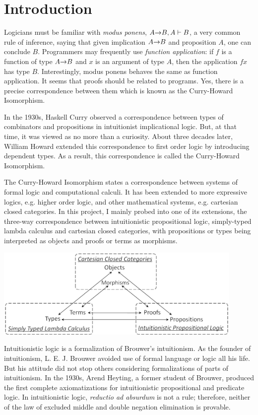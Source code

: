 \section{Introduction}
\label{sec:introduction}

Logicians must be familiar with \emph{modus ponens}, $ A \mathord{\to} B, A \vdash B $, a very common rule of inference, saying that given implication $ A \mathord{\to} B $ and proposition $ A $, one can conclude $ B $. Programmers may frequently use \emph{function application}: if $ f $ is a function of type $ A \mathord{\to} B $ and $ x $ is an argument of type $ A $, then the application $ f x $ has type $ B $. Interestingly, modus ponens behaves the same as function application. It seems that proofs should be related to programs. Yes, there is a precise correspondence between them which is known as the Curry-Howard Isomorphism.

In the 1930s, Haskell Curry observed a correspondence between types of combinators and propositions in intuitionist implicational logic. But, at that time, it was viewed as no more than a curiosity. About three decades later, William Howard extended this correspondence to first order logic by introducing dependent types. As a result, this correspondence is called the Curry-Howard Isomorphism.

The Curry-Howard Isomorphism states a correspondence between systems of formal logic and computational calculi. It has been extended to more expressive logics, e.g. higher order logic, and other mathematical systems, e.g. cartesian closed categories. In this project, I mainly probed into one of its extensions, the three-way correspondence between intuitionistic propositional logic, simply-typed lambda calculus and cartesian closed categories, with propositions or types being interpreted as objects and proofs or terms as morphisms.

\begin{center}
\includegraphics[width=0.9\textwidth]{./images/triangle}
\end{center}

Intuitionistic logic is a formalization of Brouwer’s intuitionism. As the founder of intuitionism, L. E. J. Brouwer avoided use of formal language or logic all his life. But his attitude did not stop others considering formalizations of parts of intuitionism. In the 1930s, Arend Heyting, a former student of Brouwer, produced the first complete axiomatizations for intuitionistic propositional and predicate logic. In intuitionistic logic, \emph{reductio ad absurdum} is not a rule; therefore, neither of the law of excluded middle and double negation elimination is provable.

